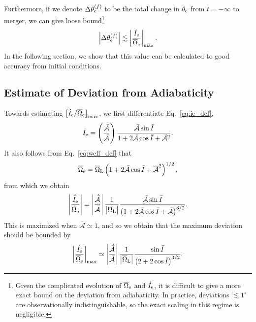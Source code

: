 \documentclass[
        twocolumn,
        twocolappendix
    ]{aastex63}
\newcommand*{\abs}[1]{\left|#1\right|}
\newcommand*{\p}[1]{\left(#1\right)}
\newcommand*{\s}[1]{\left[#1\right]}
\begin{document}
Furthermore, if we denote $\Delta \theta_{\rm e}^{(f)}$ to be the total change
in $\theta_{\rm e}$ from $t = -\infty$ to merger, we can give loose
bound\footnote{Given the complicated evolution of $\overline{\Omega}_{\rm e}$
and $\dot{I}_{\rm e}$, it is difficult to give a more exact bound on the
deviation from adiabaticity. In practice, deviations $\lesssim 1^\circ$ are
observationally indistinguishable, so the exact scaling in this regime is
negligible.}
\begin{equation}
    \abs{\Delta \theta_{\rm e}^{(f)}} \lesssim
        \abs{\frac{\dot{I}_{\rm e}}{\overline{\Omega}_{\rm e}}}_{\max}.
        \label{eq:nonad_dqeff_tot}
\end{equation}
In the following section, we show that this value can be calculated to good
accuracy from initial conditions.

\subsection{Estimate of Deviation from Adiabaticity}

Towards estimating $\s{\dot{I}_{\rm e} / \overline{\Omega}_{\rm e}}_{\max}$, we
first differentiate Eq.~\eqref{eq:ie_def},
\begin{equation}
    \dot{I}_{\rm e} = \p{\frac{\dot{\bar{\mathcal{A}}}}{
            \bar{\mathcal{A}}}}
        \frac{\bar{\mathcal{A}} \sin \bar{I}}{
            1 + 2\bar{\mathcal{A}}\cos \bar{I}
                + \bar{\mathcal{A}}^2}.
\end{equation}
It also follows from Eq.~\eqref{eq:weff_def} that
\begin{equation}
    \overline{\Omega}_{\rm e} = \overline{\Omega}_{\rm L}
        \p{1 + 2\bar{\mathcal{A}}\cos \bar{I}
            + \overline{\mathcal{A}}^2}^{1/2},
\end{equation}
from which we obtain
\begin{equation}
    \abs{\frac{\dot{\bar{I}}_{\rm e}}{\overline{\Omega}_{\rm e}}}
        = \abs{\frac{\dot{\bar{\mathcal{A}}}}{
            \bar{\mathcal{A}}}}
        \frac{1}{\abs{\overline{\Omega}_{\rm L}}}
        \frac{\bar{\mathcal{A}} \sin \bar{I}}{
            \p{1 + 2\bar{\mathcal{A}}\cos \bar{I}
                + \bar{\mathcal{A}}}^{3/2}}.
\end{equation}
This is maximized when $\bar{\mathcal{A}} \simeq 1$, and so we obtain that
the maximum deviation should be bounded by
\begin{equation}
    \abs{\frac{\dot{I}_{\rm e}}{\overline{\Omega}_{\rm e}}}_{\max}
        \simeq \abs{\frac{\dot{\bar{\mathcal{A}}}}{\bar{\mathcal{A}}}}
            \frac{1}{\abs{\overline{\Omega}_{\rm L}}}
            \frac{\sin \bar{I}}{\p{2 + 2\cos \bar{I}}^{3/2}}.
            \label{eq:idot_over_W}
\end{equation}
\end{document}
